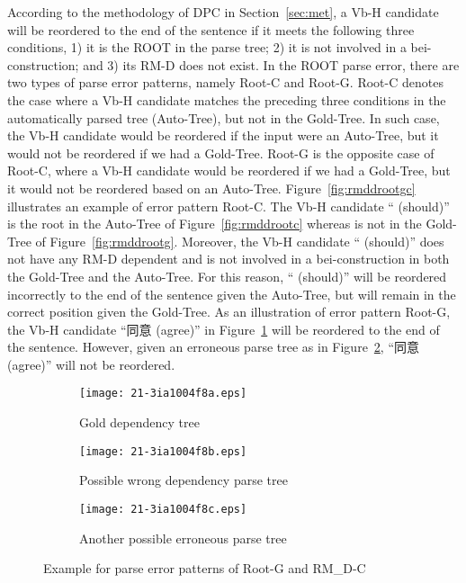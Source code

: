 \documentclass[english]{jnlp_1.4}
\begin{document}
According to the methodology of DPC in Section~\ref{sec:met}, a Vb-H candidate
will be reordered to the end of the sentence if it meets the following three conditions,
1) it is the ROOT in the parse tree; 2) it is not
involved in a bei-construction; and 3) its RM-D does not exist.
In the ROOT parse error, there are
two types of parse error patterns, namely Root-C and Root-G. Root-C denotes the case
where a Vb-H candidate matches the preceding three conditions in the automatically parsed tree (Auto-Tree), but not
in the Gold-Tree. In such case, the Vb-H candidate would be reordered if the input
were an Auto-Tree, but it would not be reordered if we had a Gold-Tree. Root-G is the opposite
case of Root-C, where a Vb-H candidate would be reordered if we had a Gold-Tree,
but it would not be reordered based on an Auto-Tree.
Figure~\ref{fig:rmddrootgc} illustrates an example of error pattern Root-C. The Vb-H candidate `` (should)''
is the root in the Auto-Tree of Figure~\ref{fig:rmddrootc} whereas is not in the Gold-Tree
of Figure~\ref{fig:rmddrootg}. Moreover, the Vb-H candidate `` (should)'' does not have any RM-D dependent and is not involved
in a bei-construction in both the Gold-Tree and the Auto-Tree.
For this reason, `` (should)'' will be reordered
incorrectly to the end of the sentence given the Auto-Tree, but will remain in the correct position
given the Gold-Tree.
As an illustration of error pattern Root-G, the Vb-H candidate ``同意 (agree)'' in Figure~\ref{fig:rootgg}
will be reordered to the end of the sentence. However, given an erroneous parse tree
as in Figure~\ref{fig:rootgc}, ``同意 (agree)'' will not be reordered.

\begin{figure}[t]
\begin{subfigure}{1\textwidth}
\begin{center}
\texttt{[image: 21-3ia1004f8a.eps]}
\end{center}
\caption{Gold dependency tree}
\label{fig:rootgg}
\end{subfigure}
\vspace{0.5\Cvs}

\begin{subfigure}{1\textwidth}
\begin{center}
\texttt{[image: 21-3ia1004f8b.eps]}
\end{center}
\caption{Possible wrong dependency parse tree}
\label{fig:rootgc}
\end{subfigure}
\vspace{0.5\Cvs}

\begin{subfigure}{1\textwidth}
\begin{center}
\texttt{[image: 21-3ia1004f8c.eps]}
\end{center}
\caption{Another possible erroneous parse tree}
\label{fig:rmdcc}
\end{subfigure}
\caption{Example for parse error patterns of Root-G and RM\_D-C}
\label{fig:rmdcrootg}
\end{figure}
\end{document}
